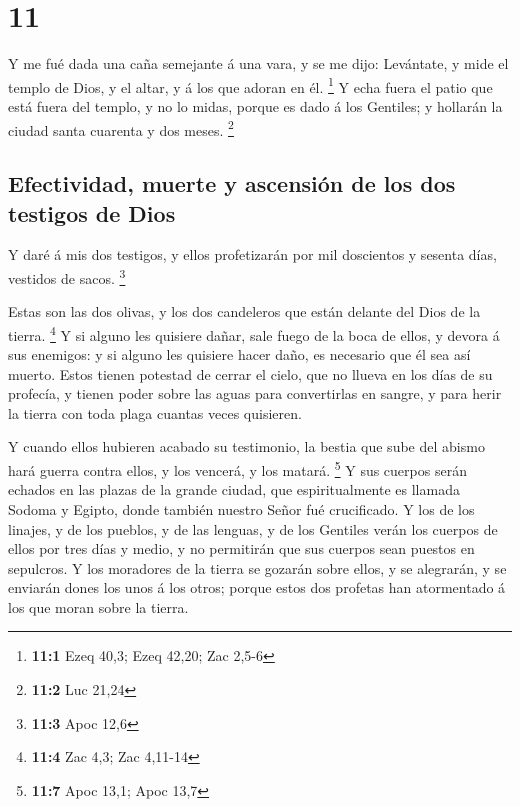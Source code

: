 \hypertarget{section-10}{%
\section{11}\label{section-10}}

 Y me fué dada una caña semejante á una vara, y se me dijo:
Levántate, y mide el templo de Dios, y el altar, y á los que adoran en
él. \footnote{\textbf{11:1} Ezeq 40,3; Ezeq 42,20; Zac 2,5-6}
 Y echa fuera el patio que está fuera del templo, y no lo
midas, porque es dado á los Gentiles; y hollarán la ciudad santa
cuarenta y dos meses. \footnote{\textbf{11:2} Luc 21,24}

\hypertarget{efectividad-muerte-y-ascensiuxf3n-de-los-dos-testigos-de-dios}{%
\subsection{Efectividad, muerte y ascensión de los dos testigos de
Dios}\label{efectividad-muerte-y-ascensiuxf3n-de-los-dos-testigos-de-dios}}

 Y daré á mis dos testigos, y ellos profetizarán por mil
doscientos y sesenta días, vestidos de sacos. \footnote{\textbf{11:3}
  Apoc 12,6}

 Estas son las dos olivas, y los dos candeleros que están
delante del Dios de la tierra. \footnote{\textbf{11:4} Zac 4,3; Zac
  4,11-14}  Y si alguno les quisiere dañar, sale fuego de la
boca de ellos, y devora á sus enemigos: y si alguno les quisiere hacer
daño, es necesario que él sea así muerto.  Estos tienen
potestad de cerrar el cielo, que no llueva en los días de su profecía, y
tienen poder sobre las aguas para convertirlas en sangre, y para herir
la tierra con toda plaga cuantas veces quisieren.

 Y cuando ellos hubieren acabado su testimonio, la bestia
que sube del abismo hará guerra contra ellos, y los vencerá, y los
matará. \footnote{\textbf{11:7} Apoc 13,1; Apoc 13,7}  Y sus
cuerpos serán echados en las plazas de la grande ciudad, que
espiritualmente es llamada Sodoma y Egipto, donde también nuestro Señor
fué crucificado.  Y los de los linajes, y de los pueblos, y
de las lenguas, y de los Gentiles verán los cuerpos de ellos por tres
días y medio, y no permitirán que sus cuerpos sean puestos en sepulcros.
 Y los moradores de la tierra se gozarán sobre ellos, y se
alegrarán, y se enviarán dones los unos á los otros; porque estos dos
profetas han atormentado á los que moran sobre la tierra.

